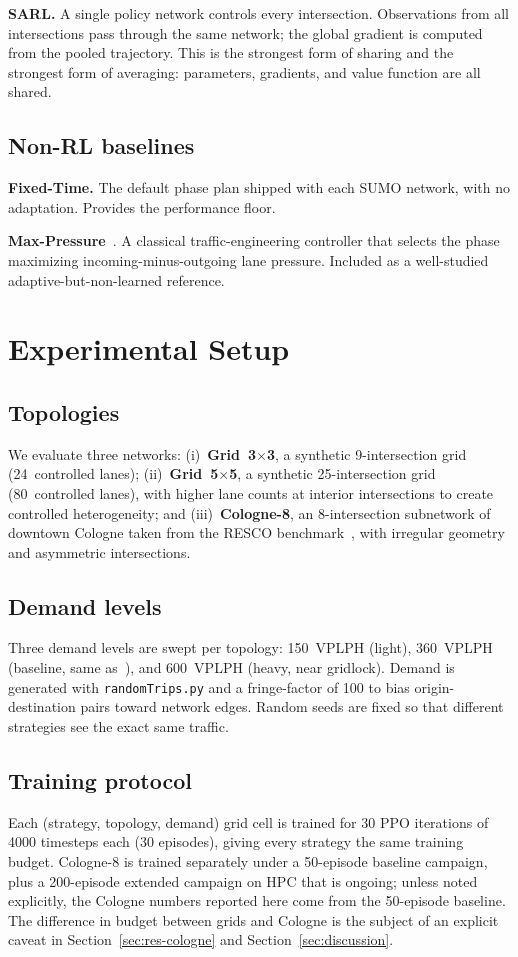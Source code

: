 \documentclass[conference]{IEEEtran}
\begin{document}
\textbf{SARL.} A single policy network controls every intersection. Observations from all intersections pass through the same network; the global gradient is computed from the pooled trajectory. This is the strongest form of sharing and the strongest form of averaging: parameters, gradients, and value function are all shared.

\subsection{Non-RL baselines}
\textbf{Fixed-Time.} The default phase plan shipped with each SUMO network, with no adaptation. Provides the performance floor.

\textbf{Max-Pressure}~\cite{varaiya2013maxpressure}. A classical traffic-engineering controller that selects the phase maximizing incoming-minus-outgoing lane pressure. Included as a well-studied adaptive-but-non-learned reference.

\section{Experimental Setup}\label{sec:setup}

\subsection{Topologies}\label{sec:setup-topologies}
We evaluate three networks: (i)~\textbf{Grid~3$\times$3}, a synthetic 9-intersection grid (24~controlled lanes); (ii)~\textbf{Grid~5$\times$5}, a synthetic 25-intersection grid (80~controlled lanes), with higher lane counts at interior intersections to create controlled heterogeneity; and (iii)~\textbf{Cologne-8}, an 8-intersection subnetwork of downtown Cologne taken from the RESCO benchmark~\cite{ault2021resco}, with irregular geometry and asymmetric intersections.

\subsection{Demand levels}\label{sec:setup-demand}
Three demand levels are swept per topology: 150~VPLPH (light), 360~VPLPH (baseline, same as~\cite{hudson2022seal}), and 600~VPLPH (heavy, near gridlock). Demand is generated with \texttt{randomTrips.py} and a fringe-factor of 100 to bias origin-destination pairs toward network edges. Random seeds are fixed so that different strategies see the exact same traffic.

\subsection{Training protocol}
Each (strategy, topology, demand) grid cell is trained for 30 PPO iterations of 4000 timesteps each (30 episodes), giving every strategy the same training budget. Cologne-8 is trained separately under a 50-episode baseline campaign, plus a 200-episode extended campaign on HPC that is ongoing; unless noted explicitly, the Cologne numbers reported here come from the 50-episode baseline. The difference in budget between grids and Cologne is the subject of an explicit caveat in Section~\ref{sec:res-cologne} and Section~\ref{sec:discussion}.
\end{document}
